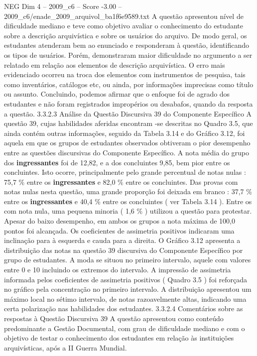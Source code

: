 \begin{textsample}{NEG Dim 4 – 2009\_c6 – Score -3.00 – 2009\_c6/enade\_2009\_arquivol\_ba1f6e9589.txt}
A questão apresentou nível de dificuldade mediano e teve como objetivo avaliar o conhecimento do estudante sobre a descrição arquivística e sobre os usuários do arquivo.
De modo geral, os estudantes atenderam bem ao enunciado e responderam à questão, identificando os tipos de usuários.
Porém, demonstraram maior dificuldade no argumento a ser relatado em relação aos elementos de descrição arquivística.
O erro mais evidenciado ocorreu na troca dos elementos com instrumentos de pesquisa, tais como inventários, catálogos etc, ou ainda, por informações imprecisas como título ou assunto.
Concluindo, podemos afirmar que o enfoque foi de agrado dos estudantes e não foram registrados impropérios ou desabafos, quando da resposta a questão. 3.3.2.3 Análise da Questão Discursiva 39 do Componente Específico A questão 39, cujas habilidades aferidas encontram -se descritas no Quadro 3.5, que ainda contém outras informações, seguido da Tabela 3.14 e do Gráfico 3.12, foi aquela em que os grupos de estudantes observados obtiveram o pior desempenho entre as questões discursivas do Componente Específico.
A nota média do grupo dos \textbf{ingressantes} foi de 12,82, e a dos concluintes 9,85, bem pior entre os concluintes.
Isto ocorre, principalmente pelo grande percentual de notas nulas : 75,7 \% entre os \textbf{ingressantes} e 82,0 \% entre os concluintes.
Das provas com notas nulas nesta questão, uma grande proporção foi deixada em branco : 37,7 \% entre os \textbf{ingressantes} e 40,4 \% entre os concluintes ( ver Tabela 3.14 ).
Entre os com nota nula, uma pequena minoria ( 1,6 \% ) utilizou a questão para protestar.
Apesar do baixo desempenho, em ambos os grupos a nota máxima de 100,0 pontos foi alcançada.
Os coeficientes de assimetria positivos indicaram uma inclinação para à esquerda e cauda para a direita.
O Gráfico 3.12 apresenta a distribuição das notas na questão 39 discursiva do Componente Específico por grupo de estudantes.
A moda se situou no primeiro intervalo, aquele com valores entre 0 e 10 incluindo os extremos do intervalo.
A impressão de assimetria informada pelos coeficientes de assimetria positivos ( Quadro 3.5 ) foi reforçada no gráfico pela concentração no primeiro intervalo.
A distribuição apresentou um máximo local no sétimo intervalo, de notas razoavelmente altas, indicando uma certa polarização nas habilidades dos estudantes. 3.3.2.4 Comentários sobre as respostas à Questão Discursiva 39 A questão apresentou como conteúdo predominante a Gestão Documental, com grau de dificuldade mediano e com o objetivo de testar o conhecimento dos estudantes em relação às instituições arquivísticas, após a II Guerra Mundial.

\end{textsample}
